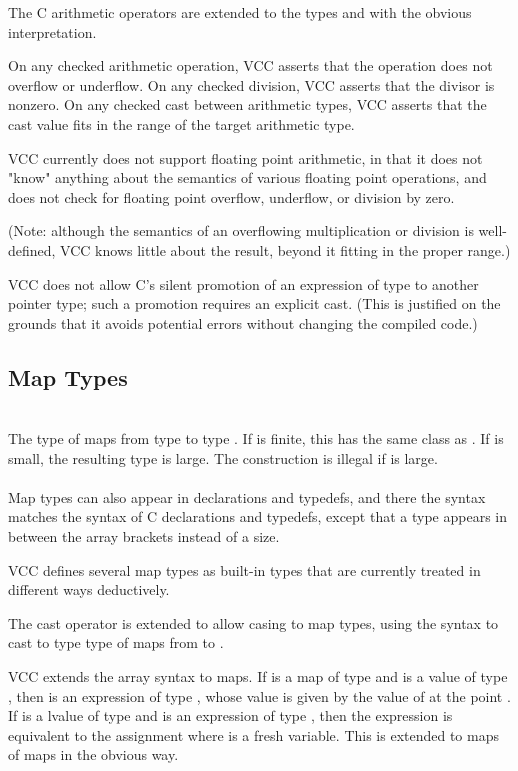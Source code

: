 \documentclass[preprint,nocopyrightspace]{sigplanconf}
\begin{document}
{{The C arithmetic operators are extended to the types \vcc{\natural}
and \vcc{\integer} with the obvious interpretation. 

On any checked arithmetic operation, VCC asserts that the operation
does not overflow or underflow. On any checked division, VCC asserts
that the divisor is nonzero. On any checked cast between arithmetic
types, VCC asserts that the cast value fits in the range of the target
arithmetic type. 

VCC currently does not support floating point arithmetic, in that it
does not "know" anything about the semantics of various floating point
operations, and does not check for floating point overflow, underflow,
or division by zero.

(Note: although the semantics of an overflowing multiplication or
division is well-defined, VCC knows little about the result,
beyond it fitting in the proper range.)

VCC does not allow C's silent promotion of an expression of
type  to another pointer type; such a promotion requires
an explicit cast. (This is justified on the grounds that it avoids
potential errors without changing the compiled code.)

\subsection{Map Types}
\\
The type of maps from type  to type . If  is
finite, this has the same class as . If  is small, the
resulting type is large. The construction is illegal if  is
large.
\\\\
Map types can also appear in
declarations and typedefs, and there the syntax matches the syntax of
C declarations and typedefs, except that a type appears in between the
array brackets instead of a size.

VCC defines several map types as built-in types that are currently
treated in different ways deductively.

The cast operator is extended to allow casing to map types, 
using the syntax  to cast  to type type of maps
from  to .

VCC extends the array syntax to maps. If  is a map of
type  and  is a value of type ,
then  is an expression of type , whose value is
given by the value of  at the point . If  is a
lvalue of type  and  is an expression of
type , then the expression  is equivalent to
the assignment 
where  is a fresh variable. This is extended to maps of maps in
the obvious way.

}}
\end{document}
